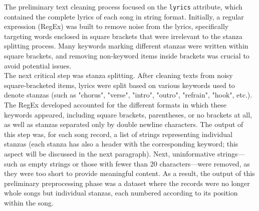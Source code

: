 The preliminary text cleaning process focused on the \texttt{lyrics} attribute,
which contained the complete lyrics of each song in string format.
Initially, a regular expression (RegEx) was built to remove noise from the
lyrics, specifically targeting words enclosed in square brackets that were
irrelevant to the stanza splitting process. Many keywords marking different
stanzas were written within square brackets, and removing non-keyword items
inside brackets was crucial to avoid potential issues.\\

The next critical step was stanza splitting. After cleaning texts from
noisy square-bracketed items, lyrics were split based on various keywords
used to denote stanzas (such as "chorus", "verse", "intro", "outro", "refrain", "hook", etc.).
The RegEx developed accounted for the different formats in which these keywords
appeared, including square brackets, parentheses, or no brackets at all, as well
as stanzas separated only by double newline characters.
The output of this step was, for each song record, a list of strings
representing individual stanzas (each stanza has also a header with the corresponding
keyword; this aspect will be discussed in the next paragraph).
Next, uninformative strings—such as empty strings or those with fewer
than 20 characters—were removed, as they were too short to provide meaningful
content.
As a result, the output of this preliminary preprocessing phase was a dataset
where the records were no longer whole songs but individual stanzas, each
numbered according to its position within the song.\\

